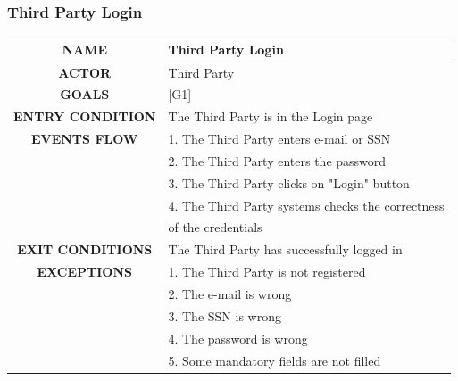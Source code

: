 \documentclass[12pt,a4paper]{article}
\begin{document}
		\subsubsection{Third Party Login}
		\begin{center}
			\begin{tabular}{| c | l |}
				\hline
				\textbf{NAME} & Third Party Login \\
				\hline
				\textbf{ACTOR} & Third Party \\
				\hline
				\textbf{GOALS} & [G1] \\
				\hline
				\textbf{ENTRY CONDITION} & The Third Party is in the Login page \\ \hline
				\textbf{EVENTS FLOW}  &
				1. The Third Party enters e-mail or SSN\\
				&2. The Third Party enters the password\\
				&3. The Third Party clicks on "Login" button\\
				&4. The Third Party systems checks the correctness\\
				& of the credentials\\
				\hline
				\textbf{EXIT CONDITIONS}  & The Third Party has successfully logged in \\ \hline
				\textbf{EXCEPTIONS} &
				1. The Third Party is not registered\\
				&2. The e-mail is wrong\\
				&3. The SSN is wrong\\
				&4. The password is wrong\\
				&5. Some mandatory fields are not filled\\
				\hline
			\end{tabular}
		\end{center}
\end{document}
